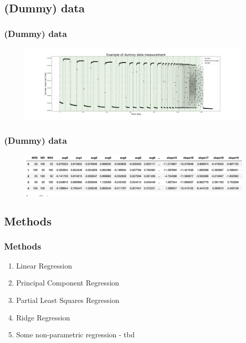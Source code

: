 \documentclass{beamer}
\begin{document}
\begin{frame}
	\section{(Dummy) data}
	\frametitle{(Dummy) data}
	
	
	\begin{figure}[!htb]
		\centering
		\includegraphics[width=1.2\textwidth]{../../figures/dummy-data.png}
	\end{figure} 

\end{frame}

\begin{frame}
	\frametitle{(Dummy) data}
	
	\begin{figure}[!htb]
		\centering
		\includegraphics[width=1\textwidth]{../../figures/dummy-feats.png}
	\end{figure} 
	
 	\end{frame}

\begin{frame}
	\section{Methods}
	\frametitle{Methods}
	
	\begin{enumerate}
		\item Linear Regression
		\item Principal Component Regression
		\item Partial Least Squares Regression
		\item Ridge Regression
		\item Some non-parametric regression - tbd
	\end{enumerate}
	
\end{frame}
\end{document}
